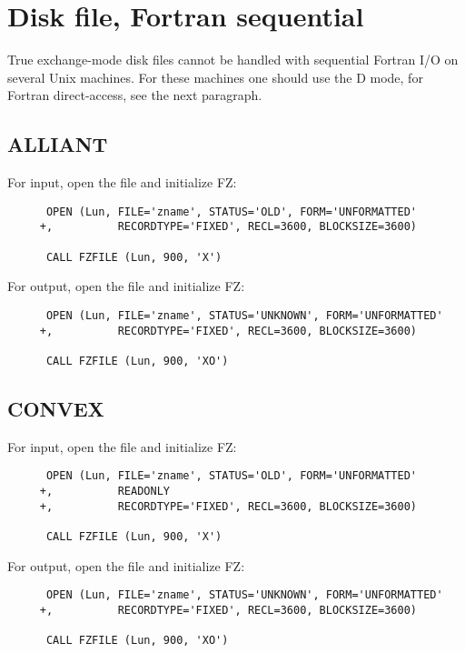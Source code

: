 \section{Disk file, Fortran sequential}

True exchange-mode disk files cannot be handled with
sequential Fortran I/O on several Unix machines.
For these machines one should use the D mode,
for Fortran direct-access, see the next paragraph.

\subsection*{ALLIANT}

For input, open the file and initialize FZ:

\begin{verbatim}
      OPEN (Lun, FILE='zname', STATUS='OLD', FORM='UNFORMATTED'
     +,          RECORDTYPE='FIXED', RECL=3600, BLOCKSIZE=3600)

      CALL FZFILE (Lun, 900, 'X')
\end{verbatim}

For output, open the file and initialize FZ:

\begin{verbatim}
      OPEN (Lun, FILE='zname', STATUS='UNKNOWN', FORM='UNFORMATTED'
     +,          RECORDTYPE='FIXED', RECL=3600, BLOCKSIZE=3600)

      CALL FZFILE (Lun, 900, 'XO')
\end{verbatim}

\subsection*{CONVEX}

For input, open the file and initialize FZ:

\begin{verbatim}
      OPEN (Lun, FILE='zname', STATUS='OLD', FORM='UNFORMATTED'
     +,          READONLY
     +,          RECORDTYPE='FIXED', RECL=3600, BLOCKSIZE=3600)

      CALL FZFILE (Lun, 900, 'X')
\end{verbatim}

For output, open the file and initialize FZ:

\begin{verbatim}
      OPEN (Lun, FILE='zname', STATUS='UNKNOWN', FORM='UNFORMATTED'
     +,          RECORDTYPE='FIXED', RECL=3600, BLOCKSIZE=3600)

      CALL FZFILE (Lun, 900, 'XO')
\end{verbatim}

